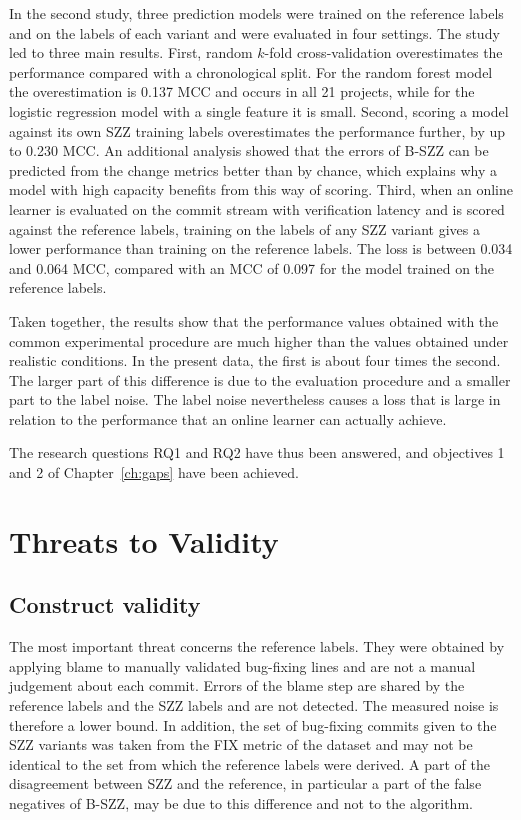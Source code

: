 \documentclass[12pt,a4paper,oneside]{report}
\begin{document}
In the second study, three prediction models were trained on the reference
labels and on the labels of each variant and were evaluated in four settings.
The study led to three main results. First, random $k$-fold cross-validation
overestimates the performance compared with a chronological split. For the
random forest model the overestimation is 0.137 MCC and occurs in all 21
projects, while for the logistic regression model with a single feature it is
small. Second, scoring a model against its own SZZ training labels
overestimates the performance further, by up to 0.230 MCC. An additional
analysis showed that the errors of B-SZZ can be predicted from the change
metrics better than by chance, which explains why a model with high capacity
benefits from this way of scoring. Third, when an online learner is evaluated
on the commit stream with verification latency and is scored against the
reference labels, training on the labels of any SZZ variant gives a lower
performance than training on the reference labels. The loss is between 0.034
and 0.064 MCC, compared with an MCC of 0.097 for the model trained on the
reference labels.

Taken together, the results show that the performance values obtained with
the common experimental procedure are much higher than the values obtained
under realistic conditions. In the present data, the first is about four
times the second. The larger part of this difference is due to the evaluation
procedure and a smaller part to the label noise. The label noise nevertheless
causes a loss that is large in relation to the performance that an online
learner can actually achieve.

The research questions RQ1 and RQ2 have thus been answered, and objectives 1
and 2 of Chapter~\ref{ch:gaps} have been achieved.

\section{Threats to Validity}\label{sec:threats}

\subsection{Construct validity}

The most important threat concerns the reference labels. They were obtained
by applying blame to manually validated bug-fixing lines and are not a manual
judgement about each commit. Errors of the blame step are shared by the
reference labels and the SZZ labels and are not detected. The measured noise
is therefore a lower bound. In addition, the set of bug-fixing commits given
to the SZZ variants was taken from the FIX metric of the dataset and may not
be identical to the set from which the reference labels were derived. A part
of the disagreement between SZZ and the reference, in particular a part of
the false negatives of B-SZZ, may be due to this difference and not to the
algorithm.
\end{document}
